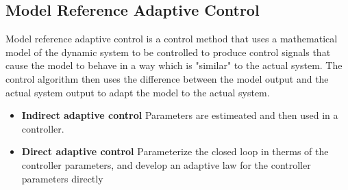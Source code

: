 \documentclass[10pt]{article}
\begin{document}
\begin{multicols*}{2}
\section{Model Reference Adaptive Control}
Model reference adaptive control is a control method that uses a mathematical model of the dynamic system to be controlled to produce control signals that cause the model to behave in a way which is "similar" to the actual system. The control algorithm then uses the difference between the model output and the actual system output to adapt the model to the actual system.
\begin{itemize}
    \item \textbf{Indirect adaptive control} Parameters are estimeated and then used in a controller.
    \item \textbf{Direct adaptive control} Parameterize the closed loop in therms of the controller parameters, and develop an adaptive law for the controller parameters directly
 \end{itemize}

\end{multicols*}
\end{document}
